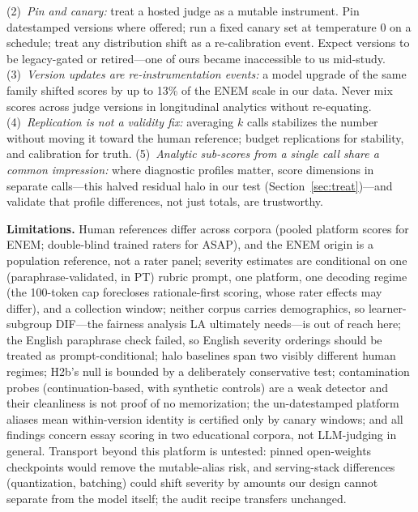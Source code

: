 \documentclass[fleqn,10pt]{JLA_article}
\begin{document}
(2)~\emph{Pin and canary:} treat a hosted judge as a mutable instrument. Pin datestamped versions
where offered; run a fixed canary set at temperature 0 on a schedule; treat any distribution
shift as a re-calibration event. Expect versions to be legacy-gated or retired---one of ours became inaccessible to us mid-study.
(3)~\emph{Version updates are re-instrumentation events:} a model upgrade of the same family
shifted scores by up to 13\% of the ENEM scale in our data. Never mix scores across judge
versions in longitudinal analytics without re-equating.
(4)~\emph{Replication is not a validity fix:} averaging $k$ calls stabilizes the number without
moving it toward the human reference; budget replications for stability, and calibration for
truth. (5)~\emph{Analytic sub-scores from a single call share a common impression:} where diagnostic profiles matter, score dimensions in separate calls---this halved residual halo in our test (Section~\ref{sec:treat})---and validate that profile differences, not just totals, are trustworthy.

\textbf{Limitations.} Human references differ across corpora (pooled platform scores for ENEM;
double-blind trained raters for ASAP), and the ENEM origin is a population reference, not a rater
panel; severity estimates are conditional on one (paraphrase-validated, in PT) rubric prompt, one platform, one decoding regime (the 100-token cap forecloses rationale-first scoring, whose rater effects may differ), and a collection window; neither corpus carries demographics, so learner-subgroup DIF---the fairness analysis LA ultimately needs---is out of reach here; the English paraphrase check failed,
so English severity orderings should be treated as prompt-conditional; halo baselines span two
visibly different human regimes; H2b's null is bounded by a deliberately conservative test;
contamination probes (continuation-based, with synthetic controls) are a weak detector and their
cleanliness is not proof of no memorization; the un-datestamped platform aliases mean
within-version identity is certified only by canary windows; and all findings concern essay
scoring in two educational corpora, not LLM-judging in general. Transport beyond this platform is untested: pinned open-weights checkpoints would remove the mutable-alias risk, and serving-stack differences (quantization, batching) could shift severity by amounts our design cannot separate from the model itself; the audit recipe transfers unchanged.
\end{document}
